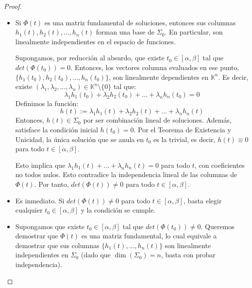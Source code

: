 \begin{proof}
    \leavevmode
    \begin{itemize}
        \item [$(1) \implies (2)$] Si $\Phi(t)$ es una matriz fundamental de soluciones, entonces sus columnas $h_1(t), h_2(t), \ldots, h_n(t)$ forman una base de $\Sigma_0$. En particular, son linealmente independientes en el espacio de funciones.
        
        Supongamos, por reducción al absurdo, que existe $t_0 \in [\alpha, \beta]$ tal que $det(\Phi(t_0)) = 0$. Entonces, los vectores columna evaluados en ese punto, $\{ h_1(t_0), h_2(t_0), \ldots, h_n(t_0) \}$, son linealmente dependientes en $\mathbb{K}^n$. Es decir, existe $(\lambda_1, \lambda_2, \ldots, \lambda_n) \in \mathbb{K}^n \setminus \{0\}$ tal que:
        \[
            \lambda_1 h_1(t_0) + \lambda_2 h_2(t_0) + \ldots + \lambda_n h_n(t_0) = 0
        \]
        Definimos la función:
        \[
            h(t) := \lambda_1 h_1(t) + \lambda_2 h_2(t) + \ldots + \lambda_n h_n(t)
        \]
        Entonces, $h(t) \in \Sigma_0$ por ser combinación lineal de soluciones. Además, satisface la condición inicial $h(t_0) = 0$. Por el Teorema de Existencia y Unicidad, la única solución que se anula en $t_0$ es la trivial, es decir, $h(t) \equiv 0$ para todo $t \in [\alpha, \beta]$.
        
        Esto implica que $\lambda_1 h_1(t) + \ldots + \lambda_n h_n(t) = 0$ para todo $t$, con coeficientes no todos nulos. Esto contradice la independencia lineal de las columnas de $\Phi(t)$. Por tanto, $det(\Phi(t)) \neq 0$ para todo $t \in [\alpha, \beta]$.

        \item [$(2) \implies (3)$] Es inmediato. Si $det(\Phi(t)) \neq 0$ para todo $t \in [\alpha, \beta]$, basta elegir cualquier $t_0 \in [\alpha, \beta]$ y la condición se cumple.

        \item [$(3) \implies (1)$] Supongamos que existe $t_0 \in [\alpha, \beta]$ tal que $det(\Phi(t_0)) \neq 0$. Queremos demostrar que $\Phi(t)$ es una matriz fundamental, lo cual equivale a demostrar que sus columnas $\{h_1(t), \ldots, h_n(t)\}$ son linealmente independientes en $\Sigma_0$ (dado que $\dim(\Sigma_0)=n$, basta con probar independencia).
        

\end{itemize}
\end{proof}
